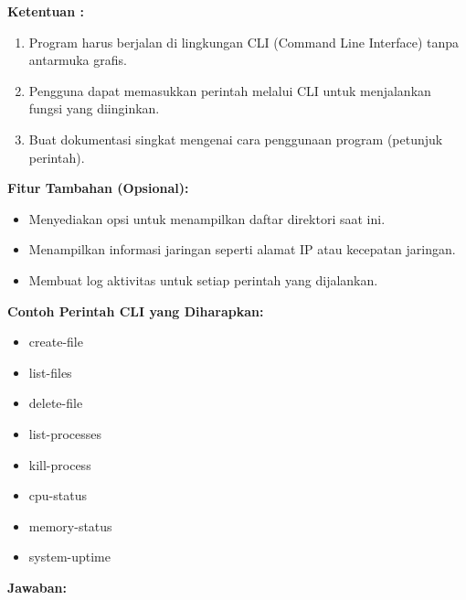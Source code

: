 \documentclass[12pt]{article}
\begin{document}
\par \textbf{Ketentuan :}
\begin{enumerate}
    \item Program harus berjalan di lingkungan CLI (Command Line Interface) tanpa antarmuka grafis.
    \item Pengguna dapat memasukkan perintah melalui CLI untuk menjalankan fungsi yang diinginkan.
    \item Buat dokumentasi singkat mengenai cara penggunaan program (petunjuk perintah).
\end{enumerate}
\par \textbf{Fitur Tambahan (Opsional):}
\begin{itemize}
    \item Menyediakan opsi untuk menampilkan daftar direktori saat ini.
    \item Menampilkan informasi jaringan seperti alamat IP atau kecepatan jaringan.
    \item Membuat log aktivitas untuk setiap perintah yang dijalankan.
\end{itemize}
\par \textbf{Contoh Perintah CLI yang Diharapkan:}
\begin{itemize}
    \item create-file 
    \item list-files
    \item delete-file 
    \item list-processes
    \item kill-process 
    \item cpu-status
    \item memory-status
    \item system-uptime
\end{itemize}
\par \textbf{Jawaban:}
\end{document}

